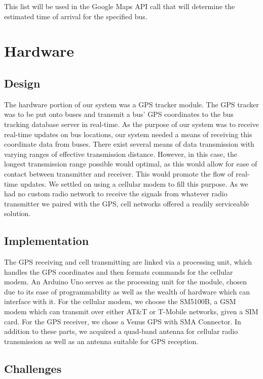 \documentclass[pageno]{jpaper}
\begin{document}
This list will be used in the Google Maps API call that will 
determine the estimated time of arrival for the specified bus.

\section{Hardware}
\subsection{Design}

The hardware portion of our system was a GPS tracker module. The GPS
tracker was to be put onto buses and transmit a bus’ GPS coordinates to the bus 
tracking database server in real-time. As the purpose of our system was to receive 
real-time updates on bus locations, our system needed a means of receiving this 
coordinate data from buses. There exist several means of data transmission with 
varying ranges of effective transmission distance. However, in this case, the longest 
transmission range possible would optimal, as this would allow for ease of contact 
between transmitter and receiver. This would promote the flow of real-time 
updates. We settled on using a cellular modem to fill this purpose. As we had no 
custom radio network to receive the signals from whatever radio transmitter we
paired with the GPS, cell networks offered a readily serviceable solution.

\subsection{Implementation}

The GPS receiving and cell transmitting are linked via a processing unit, 
which handles the GPS coordinates and then formats commands for the cellular 
modem. An Arduino Uno serves as the processing unit for the module, chosen due to 
its ease of programmability as well as the wealth of hardware which can interface 
with it. For the cellular modem, we choose the SM5100B, a GSM modem which can 
transmit over either AT\&T or T-Mobile networks, given a SIM card. For the GPS 
receiver, we chose a Venus GPS with SMA Connector. In addition to these parts, we 
acquired a quad-band antenna for cellular radio transmission as well as an antenna 
suitable for GPS reception.

\subsection{Challenges}
\end{document}
